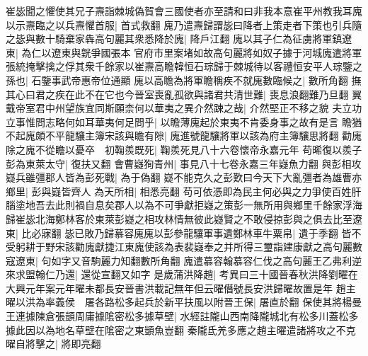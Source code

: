 崔毖聞之懼使其兄子燾詣棘城偽賀會三國使者亦至請和曰非我本意崔平州教我耳廆以示燾臨之以兵燾懼首服|{
	首式救翻}
廆乃遣燾歸謂毖曰降者上策走者下策也引兵隨之毖與數十騎棄家犇高句麗其衆悉降於廆|{
	降戶江翻}
廆以其子仁為征虜將軍鎮遼東|{
	為仁以遼東與皝爭國張本}
官府市里案堵如故高句麗將如奴子據于河城廆遣將軍張統掩擊擒之俘其衆千餘家以崔燾高瞻韓恒石琮歸于棘城待以客禮恒安平人琮鑒之孫也|{
	石鑒事武帝惠帝位通顯}
廆以高瞻為將軍瞻稱疾不就廆數臨候之|{
	數所角翻}
撫其心曰君之疾在此不在它也今晉室喪亂孤欲與諸君共清世難|{
	喪息浪翻難乃旦翻}
翼戴帝室君中州望族宜同斯願柰何以華夷之異介然踈之哉|{
	介然堅正不移之貌}
夫立功立事惟問志略何如耳華夷何足問乎|{
	以瞻薄廆起於東夷不肯委身事之故有是言}
瞻猶不起廆頗不平龍驤主簿宋該與瞻有隙|{
	廆進號龍驤將軍以該為府主簿驤思將翻}
勸廆除之廆不從瞻以憂卒　初鞠羨既死|{
	鞠羨死見八十六卷懷帝永嘉元年}
苟晞復以羨子彭為東萊太守|{
	復扶又翻}
會曹嶷狥青州|{
	事見八十七卷永嘉三年嶷魚力翻}
與彭相攻嶷兵雖彊郡人皆為彭死戰|{
	為于偽翻}
嶷不能克久之彭歎曰今天下大亂彊者為雄曹亦鄉里|{
	彭與嶷皆齊人}
為天所相|{
	相悉亮翻}
苟可依憑即為民主何必與之力爭使百姓肝腦塗地吾去此則禍自息矣郡人以為不可爭獻拒嶷之策彭一無所用與鄉里千餘家浮海歸崔毖北海鄭林客於東萊彭嶷之相攻林情無彼此嶷賢之不敢侵掠彭與之俱去比至遼東|{
	比必寐翻}
毖已敗乃歸慕容廆廆以彭參龍驤軍事遺鄭林車牛粟帛|{
	遺于季翻}
皆不受躬耕于野宋該勸廆獻捷江東廆使該為表裴嶷奉之并所得三璽詣建康獻之高句麗數寇遼東|{
	句如字又音駒麗力知翻數所角翻}
廆遣慕容翰慕容仁伐之高句麗王乙弗利逆來求盟翰仁乃還|{
	還從宣翻又如字}
是歲蒲洪降趙|{
	考異曰三十國晉春秋洪降劉曜在大興元年案元年曜未都長安晉書洪載記無年但云曜僭號長安洪歸曜故置是年}
趙主曜以洪為率義侯　屠各路松多起兵於新平扶風以附晉王保|{
	屠直於翻}
保使其將楊曼王連據陳倉張顗周庸據隂密松多據草壁|{
	水經註隴山西南降隴城北有松多川蓋松多據此因以為地名草壁在隂密之東顗魚豈翻}
秦隴氐羌多應之趙主曜遣諸將攻之不克曜自將擊之|{
	將即亮翻}


